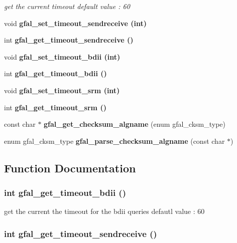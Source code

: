 \begin{CompactItemize}
\begin{CompactList}\small\item\em get the current timeout default value : 60 \item\end{CompactList}\item 
void \bf{gfal\_\-set\_\-timeout\_\-sendreceive} (int)
\item 
int \bf{gfal\_\-get\_\-timeout\_\-sendreceive} ()
\item 
void \bf{gfal\_\-set\_\-timeout\_\-bdii} (int)
\item 
int \bf{gfal\_\-get\_\-timeout\_\-bdii} ()
\item 
void \bf{gfal\_\-set\_\-timeout\_\-srm} (int)
\item 
int \bf{gfal\_\-get\_\-timeout\_\-srm} ()
\item 
const char $\ast$ \textbf{gfal\_\-get\_\-checksum\_\-algname} (enum gfal\_\-cksm\_\-type)\label{group__common__group_g11dd2ec58a632427ae12b710006c15a5}

\item 
enum gfal\_\-cksm\_\-type \textbf{gfal\_\-parse\_\-checksum\_\-algname} (const char $\ast$)\label{group__common__group_g0ac1b12c9af897b63173fd73043e1669}

\end{CompactItemize}


\subsection{Function Documentation}
\subsubsection{\setlength{\rightskip}{0pt plus 5cm}int gfal\_\-get\_\-timeout\_\-bdii ()}\label{group__common__group_g676f0d746479f2c9893609854099d614}


get the current the timeout for the bdii queries defautl value : 60 
\subsubsection{\setlength{\rightskip}{0pt plus 5cm}int gfal\_\-get\_\-timeout\_\-sendreceive ()}\label{group__common__group_g198564ca7617a8f3dec7c6b925b2c760}



